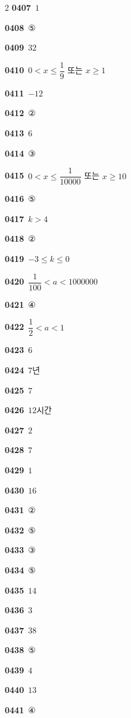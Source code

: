 \documentclass[10pt,a4paper]{article}
\begin{document}
\begin{multicols}{2}
\noindent\textbf{0407}\ $1$\par
\noindent\textbf{0408}\ ⑤\par
\noindent\textbf{0409}\ $32$\par
\noindent\textbf{0410}\ $0<x\le\dfrac{1}{9}$ 또는 $x\ge 1$\par
\noindent\textbf{0411}\ $-12$\par
\noindent\textbf{0412}\ ②\par
\noindent\textbf{0413}\ $6$\par
\noindent\textbf{0414}\ ③\par
\noindent\textbf{0415}\ $0<x\le\dfrac{1}{10000}$ 또는 $x\ge 10$\par
\noindent\textbf{0416}\ ⑤\par
\noindent\textbf{0417}\ $k>4$\par
\noindent\textbf{0418}\ ②\par
\noindent\textbf{0419}\ $-3\le k\le 0$\par
\noindent\textbf{0420}\ $\dfrac{1}{100}<a<1000000$\par
\noindent\textbf{0421}\ ④\par
\noindent\textbf{0422}\ $\dfrac{1}{2}<a<1$\par
\noindent\textbf{0423}\ $6$\par
\noindent\textbf{0424}\ $7$년\par
\noindent\textbf{0425}\ $7$\par
\noindent\textbf{0426}\ $12$시간\par
\noindent\textbf{0427}\ $2$\par
\noindent\textbf{0428}\ $7$\par
\noindent\textbf{0429}\ $1$\par
\noindent\textbf{0430}\ $16$\par
\noindent\textbf{0431}\ ②\par
\noindent\textbf{0432}\ ⑤\par
\noindent\textbf{0433}\ ③\par
\noindent\textbf{0434}\ ⑤\par
\noindent\textbf{0435}\ $14$\par
\noindent\textbf{0436}\ $3$\par
\noindent\textbf{0437}\ $38$\par
\noindent\textbf{0438}\ ⑤\par
\noindent\textbf{0439}\ $4$\par
\noindent\textbf{0440}\ $13$\par
\noindent\textbf{0441}\ ④\par

\end{multicols}
\end{document}
